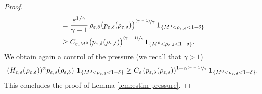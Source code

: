 \documentclass[JEP,XML,SOM,Unicode,NoEqCountersInSection]{cedram}
\newcommand{\<}{\bigl\langle}
\renewcommand{\>}{\bigr\rangle}
\newcommand{\psfrac}[2]{\sfrac{(#1)}{#2}}
\theoremstyle{definition}
\theoremstyle{remark}
\let\ep\varepsilon
\begin{document}
\begin{proof}
\begin{align*}
& = \dfrac{\ep^{1/\gamma}}{\gamma-1}\, \rho_{\ep,\delta} \big(p_{\ep,\delta}(\rho_{\ep,\delta})\big)^{\psfrac{\gamma-1}{\gamma}} \,\mathbf{1}_{\{M^0 < \rho_{\varepsilon,\delta} < 1-\delta\}} \\
& \geq C_{\ep,M^0} \big(p_{\ep,\delta}(\rho_{\ep,\delta})\big)^{\psfrac{\gamma-1}{\gamma}} \,\mathbf{1}_{\{M^0 < \rho_{\varepsilon,\delta} < 1-\delta\}}.
\end{align*}
We obtain again a control of the pressure (we recall that $\gamma > 1$)
\[
(H_{\varepsilon,\delta}(\rho_{\varepsilon, \delta}))^{\alpha}
p_{\varepsilon,\delta}(\rho_{\varepsilon,\delta})\,
\,\mathbf{1}_{\{M^0 <\rho_{\varepsilon,\delta} < 1-\delta\} }
\geq C_{\varepsilon}\, (p_{\varepsilon,\delta}(\rho_{\varepsilon,\delta}))^{1+\alpha\psfrac{\gamma-1}{\gamma}}
\,\mathbf{1}_{\{M^0 <\rho_{\varepsilon,\delta} < 1-\delta\} }.
\]
This concludes the proof of Lemma \ref{lem:estim-pressure}.
\end{proof}

\end{document}
